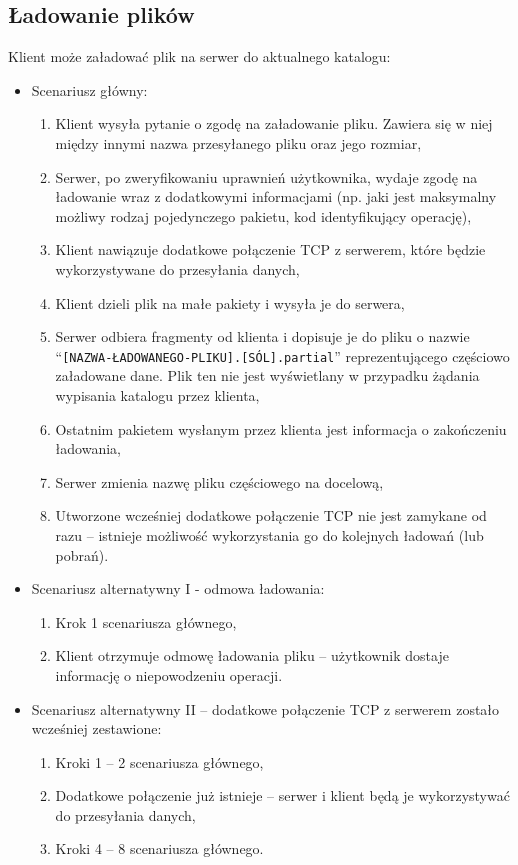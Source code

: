 \documentclass[10pt,a4paper]{article}
\newcommand{\quotes}[1]{``#1''}
\begin{document}
\subsection{Ładowanie plików}
\noindent Klient może załadować plik na serwer do aktualnego katalogu:
\begin{itemize}
    \item Scenariusz główny:
    \begin{enumerate}
        \item Klient wysyła pytanie o zgodę na załadowanie pliku. Zawiera się w niej między innymi nazwa przesyłanego pliku oraz jego rozmiar,
        \item Serwer, po zweryfikowaniu uprawnień użytkownika, wydaje zgodę na ładowanie wraz z dodatkowymi informacjami (np. jaki jest maksymalny możliwy rodzaj pojedynczego pakietu, kod identyfikujący operację),
        \item Klient nawiązuje dodatkowe połączenie TCP z serwerem, które będzie wykorzystywane do przesyłania danych,
        \item Klient dzieli plik na małe pakiety i wysyła je do serwera,
        \item Serwer odbiera fragmenty od klienta i dopisuje je do pliku o nazwie \quotes{\texttt{[NAZWA-ŁADOWANEGO-PLIKU].[SÓL].partial}} reprezentującego częściowo załadowane dane. Plik ten nie jest wyświetlany w przypadku żądania wypisania katalogu przez klienta,
        \item Ostatnim pakietem wysłanym przez klienta jest informacja o zakończeniu ładowania,
        \item Serwer zmienia nazwę pliku częściowego na docelową,
        \item Utworzone wcześniej dodatkowe połączenie TCP nie jest zamykane od razu -- istnieje możliwość wykorzystania go do kolejnych ładowań (lub pobrań).
    \end{enumerate}

    \item Scenariusz alternatywny I - odmowa ładowania:
    \begin{enumerate}
        \item Krok 1 scenariusza głównego,
        \item Klient otrzymuje odmowę ładowania pliku -- użytkownik dostaje informację o niepowodzeniu operacji.
    \end{enumerate}

    \item Scenariusz alternatywny II -- dodatkowe połączenie TCP z serwerem zostało wcześniej zestawione:
    \begin{enumerate}
        \item Kroki 1 -- 2 scenariusza głównego,
        \item Dodatkowe połączenie już istnieje -- serwer i klient będą je wykorzystywać do przesyłania danych,
        \item Kroki 4 -- 8 scenariusza głównego.
    \end{enumerate}


\end{itemize}
\end{document}
